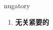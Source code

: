 
\begin{frame}
{\huge nugatory}
\begin{center}
\begin{enumerate}\Large
  \item \textbf{无关紧要的}
\end{enumerate}
\end{center}
\end{frame}

